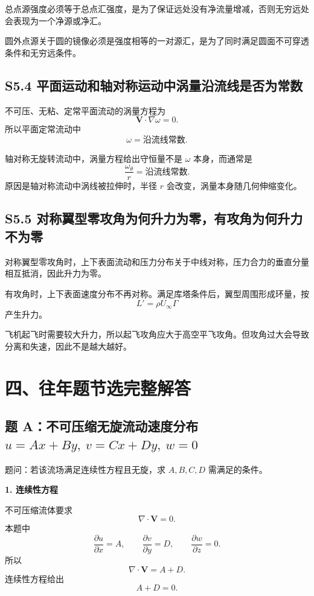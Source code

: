 ﻿\documentclass[UTF8,zihao=-4]{ctexart}
\begin{document}
总点源强度必须等于总点汇强度，是为了保证远处没有净流量增减，否则无穷远处会表现为一个净源或净汇。

圆外点源关于圆的镜像必须是强度相等的一对源汇，是为了同时满足圆面不可穿透条件和无穷远条件。

\subsection*{S5.4 平面运动和轴对称运动中涡量沿流线是否为常数}

不可压、无粘、定常平面流动的涡量方程为
\[
\bm V\cdot\nabla\omega=0.
\]
所以平面定常流动中
\[
\boxed{\omega=\text{沿流线常数}.}
\]

轴对称无旋转流动中，涡量方程给出守恒量不是 \(\omega\) 本身，而通常是
\[
\boxed{\frac{\omega_\theta}{r}=\text{沿流线常数}.}
\]
原因是轴对称流动中涡线被拉伸时，半径 \(r\) 会改变，涡量本身随几何伸缩变化。

\subsection*{S5.5 对称翼型零攻角为何升力为零，有攻角为何升力不为零}

对称翼型零攻角时，上下表面流动和压力分布关于中线对称，压力合力的垂直分量相互抵消，因此升力为零。

有攻角时，上下表面速度分布不再对称。满足库塔条件后，翼型周围形成环量，按
\[
L'=\rho U_\infty\Gamma
\]
产生升力。

飞机起飞时需要较大升力，所以起飞攻角应大于高空平飞攻角。但攻角过大会导致分离和失速，因此不是越大越好。

\section*{四、往年题节选完整解答}

\subsection*{题 A：不可压缩无旋流动速度分布 \(u=Ax+By,\ v=Cx+Dy,\ w=0\)}

题问：若该流场满足连续性方程且无旋，求 \(A,B,C,D\) 需满足的条件。

\textbf{1. 连续性方程}

不可压缩流体要求
\[
\nabla\cdot\bm V=0.
\]
本题中
\[
\frac{\partial u}{\partial x}=A,\qquad
\frac{\partial v}{\partial y}=D,\qquad
\frac{\partial w}{\partial z}=0.
\]
所以
\[
\nabla\cdot\bm V=A+D.
\]
连续性方程给出
\[
\boxed{A+D=0.}
\]
\end{document}
